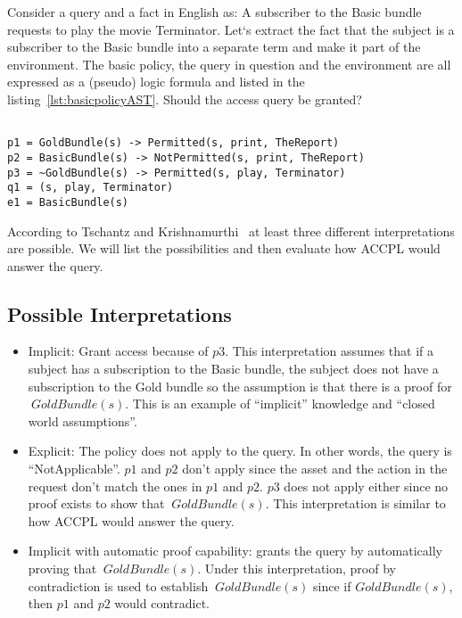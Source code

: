 Consider a query and a fact in English as: A subscriber to the Basic bundle requests to play the movie Terminator. Let`s extract the fact that the subject is a subscriber to the Basic bundle into a separate term and make it part of the environment. The basic policy, the query in question and the environment are all expressed as a (pseudo) logic formula and listed in the listing~\ref{lst:basicpolicyAST}. Should the access query be granted?

\lstset{mathescape, language=AST}  
\begin{lstlisting}[frame=single, caption={Basic Policy},label={lst:basicpolicyAST}]

p1 = GoldBundle(s) -> Permitted(s, print, TheReport) 
p2 = BasicBundle(s) -> NotPermitted(s, print, TheReport) 
p3 = ~GoldBundle(s) -> Permitted(s, play, Terminator)
q1 = (s, play, Terminator) 
e1 = BasicBundle(s)
\end{lstlisting}


According to Tschantz and Krishnamurthi~\cite{Tschantz} at least three different interpretations are possible. We will list the possibilities and then evaluate how \ac{ACCPL} would answer the query.

\subsection{Possible Interpretations}\label{sec:threeinterpretations}
\begin{itemize}
\item Implicit: Grant access because of $p3$. This interpretation assumes that if a subject has a subscription to the Basic bundle, the subject does not have a subscription to the Gold bundle so the assumption is that there is a proof for $~GoldBundle(s)$. This is an example of ``implicit'' knowledge and ``closed world assumptions''.

\item Explicit: The policy does not apply to the query. In other words, the query is ``NotApplicable''. $p1$ and $p2$ don't apply since the asset and the action in the request don't match the ones in $p1$ and $p2$. $p3$ does not apply either since no proof exists to show that $~GoldBundle(s)$. This interpretation is similar to how \ac{ACCPL} would answer the query.

\item Implicit with automatic proof capability: grants the query by automatically proving that $~GoldBundle(s)$. Under this interpretation, proof by contradiction is used to establish $~GoldBundle(s)$ since if $GoldBundle(s)$, then $p1$ and $p2$ would contradict.
\end{itemize}

